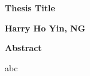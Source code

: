 \thispagestyle{plain}
\begin{center}
    \Large
    \textbf{Thesis Title}
    
    \vspace{0.4cm}
    \large
  
    
    \vspace{0.4cm}
    \textbf{Harry Ho Yin, NG}
    
    \vspace{0.9cm}
    \textbf{Abstract}
\end{center}
abc
